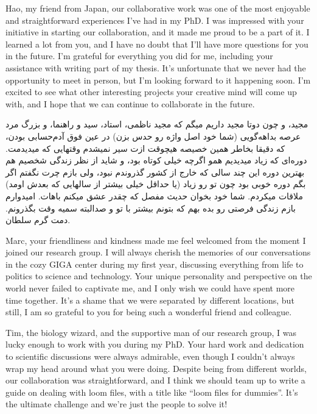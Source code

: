 Hao, my friend from Japan, our collaborative work was one of the most enjoyable and straightforward experiences I’ve had in my PhD. I was impressed with your initiative in starting our collaboration, and it made me proud to be a part of it. I learned a lot from you, and I have no doubt that I'll have more questions for you in the future. I'm grateful for everything you did for me, including your assistance with writing part of my thesis. It's unfortunate that we never had the opportunity to meet in person, but I'm looking forward to it happening soon. I'm excited to see what other interesting projects your creative mind will come up with, and I hope that we can continue to collaborate in the future.

\begin{flushright}
\foreignlanguage{persian}
{
مجید، و چون دوتا مجید داریم میگم که مجید ناظمی، استاد، سید و راهنما، و بزرگ مرد عرصه بداهه‌گویی (شما خود اصل واژه رو حدس بزن) در عین فوق آدم‌حسابی بودن، که دقیقا بخاطر همین خصیصه هیچوقت ازت سیر نمیشدم وقتهایی که میدیدمت. دوره‌ای که زیاد میدیدیم همو اگرچه خیلی کوتاه بود، و شاید از نظر زندگی شخصیم هم بهترین دوره این چند سالی که خارج از کشور گذروندم نبود، ولی بازم چرت نگفتم اگر بگم دوره خوبی بود چون تو رو زیاد (یا حداقل خیلی بیشتر از سالهایی که بعدش اومد) ملاقات میکردم. شما خود بخوان حدیث مفصل که چقدر عشق میکنم باهات. امیدوارم بازم زندگی فرصتی رو بده بهم که بتونم بیشتر با تو و صدالبته سمیه وقت بگذرونم. دمت گرم سلطان.
}
\end{flushright}

Marc, your friendliness and kindness made me feel welcomed from the moment I joined our research group. I will always cherish the memories of our conversations in the cozy GIGA center during my first year, discussing everything from life to politics to science and technology. Your unique personality and perspective on the world never failed to captivate me, and I only wish we could have spent more time together. It's a shame that we were separated by different locations, but still, I am so grateful to you for being such a wonderful friend and colleague.

Tim, the biology wizard, and the supportive man of our research group, I was lucky enough to work with you during my PhD. Your hard work and dedication to scientific discussions were always admirable, even though I couldn't always wrap my head around what you were doing. Despite being from different worlds, our collaboration was straightforward, and I think we should team up to write a guide on dealing with loom files, with a title like ``loom files for dummies''. It's the ultimate challenge and we're just the people to solve it!

